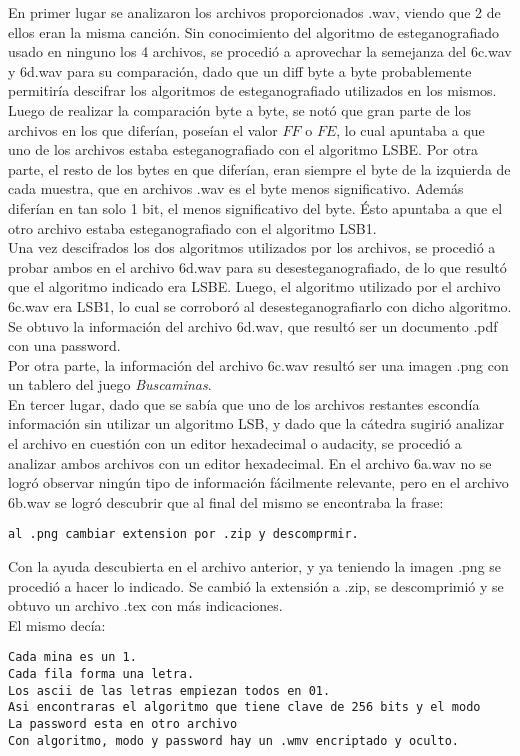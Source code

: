 \documentclass{article}
\begin{document}
\noindent En primer lugar se analizaron los archivos proporcionados .wav, viendo que 2 de ellos eran la misma canción. Sin conocimiento del algoritmo de esteganografiado usado en ninguno los 4 archivos, se procedió a aprovechar la semejanza del 6c.wav y 6d.wav para su comparación, dado que un diff byte a byte probablemente permitiría descifrar los algoritmos de esteganografiado utilizados en los mismos.\\
\noindent Luego de realizar la comparación byte a byte, se notó que gran parte de los archivos en los que diferían, poseían el valor $FF$ o $FE$, lo cual apuntaba a que uno de los archivos estaba esteganografiado con el algoritmo LSBE. Por otra parte, el resto de los bytes en que diferían, eran siempre el byte de la izquierda de cada muestra, que en archivos .wav es el byte menos significativo. Además diferían en tan solo 1 bit, el menos significativo del byte. Ésto apuntaba a que el otro archivo estaba esteganografiado con el algoritmo LSB1.\\
\noindent Una vez descifrados los dos algoritmos utilizados por los archivos, se procedió a probar ambos en el archivo 6d.wav para su desesteganografiado, de lo que resultó que el algoritmo indicado era LSBE. Luego, el algoritmo utilizado por el archivo 6c.wav era LSB1, lo cual se corroboró al desesteganografiarlo con dicho algoritmo.\\
\noindent Se obtuvo la información del archivo 6d.wav, que resultó ser un documento .pdf con una password.\\
\noindent Por otra parte, la información del archivo 6c.wav resultó ser una imagen .png con un tablero del juego \textit{Buscaminas}.\\
\noindent En tercer lugar, dado que se sabía que uno de los archivos restantes escondía información sin utilizar un algoritmo LSB, y dado que la cátedra sugirió analizar el archivo en cuestión con un editor hexadecimal o audacity, se procedió a analizar ambos archivos con un editor hexadecimal. En el archivo 6a.wav no se logró observar ningún tipo de información fácilmente relevante, pero en el archivo 6b.wav se logró descubrir que al final del mismo se encontraba la frase:
\begin{verbatim}
al .png cambiar extension por .zip y descomprmir.
\end{verbatim}

\noindent Con la ayuda descubierta en el archivo anterior, y ya teniendo la imagen .png se procedió a hacer lo indicado. Se cambió la extensión a .zip, se descomprimió y se obtuvo un archivo .tex con más indicaciones.\\
El mismo decía:
\begin{verbatim}
Cada mina es un 1.
Cada fila forma una letra.
Los ascii de las letras empiezan todos en 01.
Asi encontraras el algoritmo que tiene clave de 256 bits y el modo
La password esta en otro archivo
Con algoritmo, modo y password hay un .wmv encriptado y oculto.
\end{verbatim}
\end{document}
